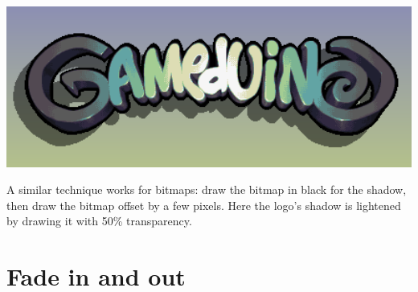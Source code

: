 \documentclass[10pt]{book}
\begin{document}
\begin{CJK}{UTF8}{gkai}
\noindent
\begin{minipage}[][][t]{0.45\textwidth}
\includegraphics[width=1.0\textwidth]{assets/logodrop.png}
\end{minipage}
\begin{minipage}[][][t]{0.55\textwidth}
A similar technique works for bitmaps: draw the bitmap in black for the shadow, then draw the bitmap
offset by a few pixels.
Here the logo's shadow is lightened by drawing it with 50\% transparency.
\end{minipage}

\newpage
\section{Fade in and out}


\end{CJK}
\end{document}
